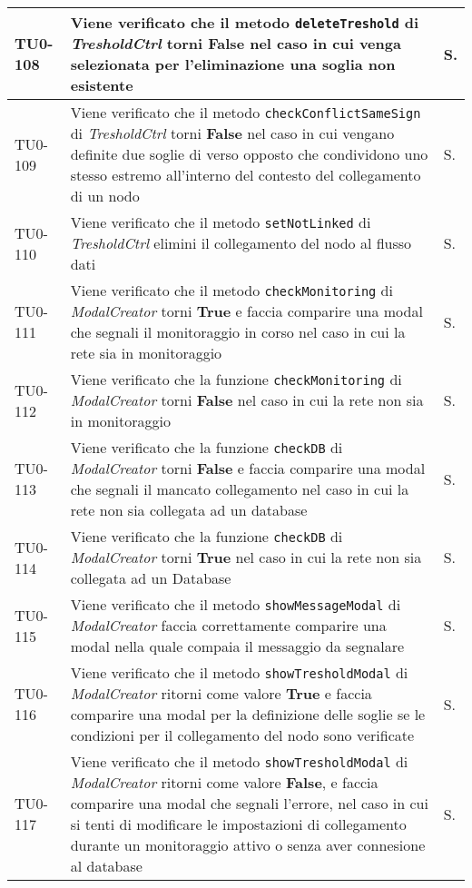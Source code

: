 \begin{longtable}{|C{.15\textwidth}|m{.66\textwidth}|C{.10\textwidth}|}
\hline
TU0-108 & Viene verificato che il metodo \texttt{deleteTreshold} di \textit{TresholdCtrl} torni \textbf{False} nel caso in cui venga selezionata per l'eliminazione una soglia non esistente & S.\\
\hline
{}TU0-109 & Viene verificato che il metodo \texttt{checkConflictSameSign} di \textit{TresholdCtrl} torni \textbf{False} nel caso in cui vengano definite due soglie di verso opposto che condividono uno stesso estremo all'interno del contesto del collegamento di un nodo & S.\\
\hline
TU0-110 & Viene verificato che il metodo \texttt{setNotLinked} di \textit{TresholdCtrl} elimini il collegamento del nodo al flusso dati & S.\\
\hline
{}TU0-111 & Viene verificato che il metodo \texttt{checkMonitoring} di \textit{ModalCreator} torni \textbf{True} e faccia comparire una modal che segnali il monitoraggio in corso nel caso in cui la rete sia in monitoraggio & S. \\
\hline
TU0-112 & Viene verificato che la funzione \texttt{checkMonitoring} di \textit{ModalCreator} torni \textbf{False} nel caso in cui la rete non sia in monitoraggio & S. \\
\hline
{}TU0-113 & Viene verificato che la funzione \texttt{checkDB} di \textit{ModalCreator} torni \textbf{False} e faccia comparire una modal che segnali il mancato collegamento nel caso in cui la rete non sia collegata ad un database & S. \\
\hline
TU0-114 & Viene verificato che la funzione \texttt{checkDB} di \textit{ModalCreator} torni \textbf{True} nel caso in cui la rete non sia collegata ad un Database & S. \\
\hline
{}TU0-115 & Viene verificato che il metodo \texttt{showMessageModal} di \textit{ModalCreator} faccia correttamente comparire una modal nella quale compaia il messaggio da segnalare & S. \\
\hline
TU0-116 & Viene verificato che il metodo \texttt{showTresholdModal} di \textit{ModalCreator} ritorni come valore \textbf{True} e faccia comparire una modal per la definizione delle soglie se le condizioni per il collegamento del nodo sono verificate & S. \\
\hline
{}TU0-117 & Viene verificato che il metodo \texttt{showTresholdModal} di \textit{ModalCreator} ritorni come valore \textbf{False}, e faccia comparire una modal che segnali l'errore, nel caso in cui si tenti di modificare le impostazioni di collegamento durante un monitoraggio attivo o senza aver connesione al database  & S. \\

\end{longtable}
